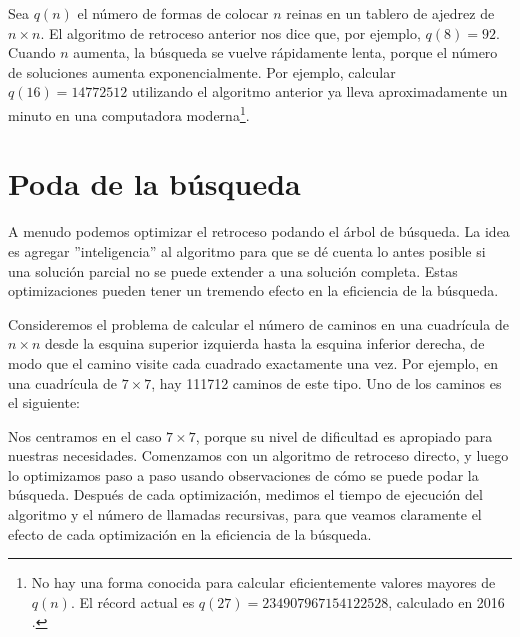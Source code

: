 Sea $q(n)$ el número de formas
de colocar $n$ reinas en un tablero de ajedrez de $n \times n$.
El algoritmo de retroceso anterior
nos dice que, por ejemplo, $q(8)=92$.
Cuando $n$ aumenta, la búsqueda se vuelve rápidamente lenta,
porque el número de soluciones aumenta
exponencialmente.
Por ejemplo, calcular $q(16)=14772512$
utilizando el algoritmo anterior ya lleva aproximadamente un minuto
en una computadora moderna\footnote{No hay una forma conocida para
calcular eficientemente valores mayores de $q(n)$. El récord actual es
$q(27)=234907967154122528$, calculado en 2016 \cite{q27}.}.

\section{Poda de la búsqueda}

A menudo podemos optimizar el retroceso
podando el árbol de búsqueda.
La idea es agregar ''inteligencia'' al algoritmo
para que se dé cuenta lo antes posible
si una solución parcial no se puede extender
a una solución completa.
Estas optimizaciones pueden tener un tremendo
efecto en la eficiencia de la búsqueda.

Consideremos el problema
de calcular el número de caminos
en una cuadrícula de $n \times n$ desde la esquina superior izquierda
hasta la esquina inferior derecha, de modo que el
camino visite cada cuadrado exactamente una vez.
Por ejemplo, en una cuadrícula de $7 \times 7$,
hay 111712 caminos de este tipo.
Uno de los caminos es el siguiente:



\begin{center}
\end{center}

Nos centramos en el caso $7 \times 7$,
porque su nivel de dificultad es apropiado para nuestras necesidades.
Comenzamos con un algoritmo de retroceso directo,
y luego lo optimizamos paso a paso usando observaciones
de cómo se puede podar la búsqueda.
Después de cada optimización, medimos el tiempo de ejecución
del algoritmo y el número de llamadas recursivas,
para que veamos claramente el efecto de cada
optimización en la eficiencia de la búsqueda.

